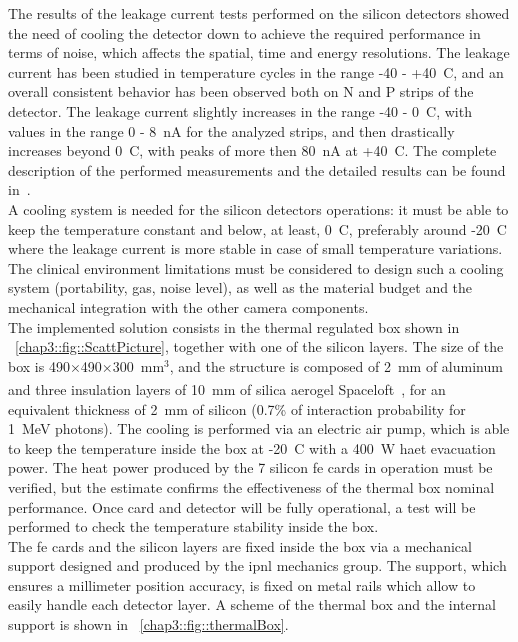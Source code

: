 The results of the leakage current tests performed on the silicon detectors showed the need of cooling the detector down to achieve the required performance in terms of noise, which affects the spatial, time and energy resolutions. The leakage current has been studied in temperature cycles in the range -40 - +40~\textdegree{}C, and an overall consistent behavior has been observed both on N and P strips of the detector. The leakage current slightly increases in the range -40 - 0~\textdegree{}C, with values in the range 0 - 8~nA for the analyzed strips, and then drastically increases beyond 0~\textdegree{}C, with peaks of more then 80~nA at +40~\textdegree{}C. The complete description of the performed measurements and the detailed results can be found in~\cite{Ley2015}.\\
A cooling system is needed for the silicon detectors operations: it must be able to keep the temperature constant and below, at least, 0~\textdegree{}C, preferably around -20~\textdegree{}C where the leakage current is more stable in case of small temperature variations. The clinical environment limitations must be considered to design such a cooling system (portability, gas, noise level), as well as the material budget and the mechanical integration with the other camera components.\\
The implemented solution consists in the thermal regulated box shown in \figurename~\ref{chap3::fig::ScattPicture}, together with one of the silicon layers. The size of the box is 490$\times$490$\times$300~mm$^3$, and the structure is composed of 2~mm of aluminum and three insulation layers of 10~mm of silica aerogel Spaceloft\textsuperscript{\textregistered}~\parencite{Spaceloft2011}, for an equivalent thickness of 2~mm of silicon (0.7\% of interaction probability for 1~MeV photons). The cooling is performed via an electric air pump, which is able to keep the temperature inside the box at -20~\textdegree{}C with a 400~W haet evacuation power. The heat power produced by the 7 silicon \gls{fe} cards in operation must be verified, but the estimate confirms the effectiveness of the thermal box nominal performance. Once card and detector will be fully operational, a test will be performed to check the temperature stability inside the box.\\
The 	\gls{fe} cards and the silicon layers are fixed inside the box via a mechanical support designed and produced by the \gls{ipnl} mechanics group. The support, which ensures a millimeter position accuracy, is fixed on metal rails which allow to easily handle each detector layer. A scheme of the thermal box and the internal support is shown in \figurename~\ref{chap3::fig::thermalBox}.
    
